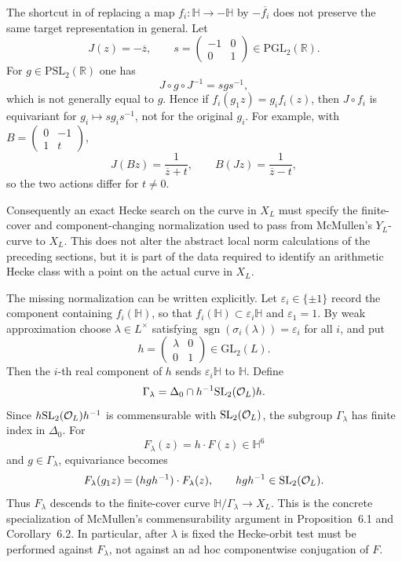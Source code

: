 The shortcut in \cite[Sec.~1.4]{Mostaed2026} of replacing a map
$f_i:\mathbb H\to-\mathbb H$ by $-\overline{f_i}$ does not preserve the same target
representation in general.  Let
\[
 J(z)=-\overline z,
 \qquad
 s=\begin{pmatrix}-1&0\\0&1\end{pmatrix}\in\mathrm{PGL}_2(\mathbb R).
\]
For $g\in\mathrm{PSL}_2(\mathbb R)$ one has
\[
 J\circ g\circ J^{-1}=s g s^{-1},
\]
which is not generally equal to $g$.  Hence if
$f_i(g_1z)=g_i f_i(z)$, then $J\circ f_i$ is equivariant for
$g_i\mapsto s g_i s^{-1}$, not for the original $g_i$.  For example, with
$B=\left(\begin{smallmatrix}0&-1\\1&t\end{smallmatrix}\right)$,
\[
 J(Bz)=\frac{1}{\overline z+t},
 \qquad
 B(Jz)=\frac{1}{\overline z-t},
\]
so the two actions differ for $t\ne0$.

Consequently an exact Hecke search on the curve in $X_L$ must specify the finite-cover
and component-changing normalization used to pass from McMullen's $Y_L$-curve to
$X_L$.  This does not alter the abstract local norm calculations of the preceding
sections, but it is part of the data required to identify an arithmetic Hecke class with
a point on the actual curve in $X_L$.

The missing normalization can be written explicitly.  Let
$\varepsilon_i\in\{\pm1\}$ record the component containing $f_i(\mathbb H)$, so that
$f_i(\mathbb H)\subset \varepsilon_i\mathbb H$ and $\varepsilon_1=1$.  By weak
approximation choose $\lambda\in L^\times$ satisfying
$\operatorname{sgn}(\sigma_i(\lambda))=\varepsilon_i$ for all $i$, and put
\[
 h=\begin{pmatrix}\lambda&0\\0&1\end{pmatrix}\in\mathrm{GL}_2(L).
\]
Then the $i$-th real component of $h$ sends $\varepsilon_i\mathbb H$ to $\mathbb H$.
Define
\begin{equation}\label{eq:explicitcovergroup}
 \Gamma_\lambda
 =\Delta_0\cap h^{-1}\mathrm{SL}_2(\mathcal O_L)h.
\end{equation}
Since $h\mathrm{SL}_2(\mathcal O_L)h^{-1}$ is commensurable with
$\mathrm{SL}_2(\mathcal O_L)$, the subgroup $\Gamma_\lambda$ has finite index in $\Delta_0$.
For
\[
 F_\lambda(z)=h\cdot F(z)\in\mathbb H^6
\]
and $g\in\Gamma_\lambda$, equivariance becomes
\[
 F_\lambda(g_1z)=(hgh^{-1})\cdot F_\lambda(z),
 \qquad hgh^{-1}\in\mathrm{SL}_2(\mathcal O_L).
\]
Thus $F_\lambda$ descends to the finite-cover curve
$\mathbb H/\Gamma_\lambda\to X_L$.  This is the concrete specialization of McMullen's
commensurability argument in Proposition~6.1 and Corollary~6.2.  In particular, after
$\lambda$ is fixed the Hecke-orbit test must be performed against $F_\lambda$, not
against an ad hoc componentwise conjugation of $F$.

